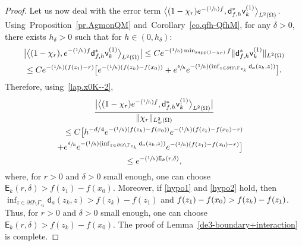 \documentclass[JEP,XML,SOM,Unicode,NoEqCountersInSection,NoFloatCountersInSection,published]{cedram}
\newcommand{\Psfrac}[2]{(\sfrac{#1}{#2})}
\let\lp\langle
\let\rp\rangle
\DeclareMathOperator\supp{supp}
\theoremstyle{plain}
\theoremstyle{definition}
\begin{document}
\begin{proof}
Let us now deal with the error term $ \big \lp (1- \chi_r) e^{-\Psfrac 1hf}, \mathsf d^*_{f,h} \mathsf v_k^{(1)}\big\rp_{L^2(\Omega)} $.
Using~Proposition~\ref{pr.AgmonQM} and~Corollary~\ref{co.qfh-QfhM}, for any $\delta>0$, there exists $h_\delta>0$ such that for $h\in (0,h_\delta)$:\vspace*{-3pt}
\begin{multline*}
\big \vert \big \lp(1- \chi_r),e^{-\Psfrac 1hf}\mathsf d^*_{f,h} \mathsf v_k^{(1)}\big\rp_{L^2(\Omega)}\big \vert \le C e^{-\Psfrac 1h \min_{ \supp (1-\chi_r) }f }\Vert\mathsf d^*_{f,h} \mathsf v_k^{(1)} \Vert_{L^2(\Omega)} \\
\le Ce^{-\Psfrac 1h (f(z_1)-r)} \big[ e^{-\Psfrac 1h(f(z_k)-f(x_0))}+e^{\sfrac{ \delta }{h}} e^{-\Psfrac 1h(\inf_{z\in \partial \Omega \setminus \Gamma_{z_k}} \mathsf d_a(z_k,z))}\big].
\end{multline*}
\enlargethispage{-2\baselineskip}
\pagebreak[2]
Therefore, using~\eqref{lap.x0K--2},\vspace*{-3pt}
\begin{multline*}
\frac{ \big \vert \big \lp (1- \chi_r) e^{-\Psfrac 1hf}, \mathsf d^*_{f,h} \mathsf v_k^{(1)}\big\rp_{L^2(\Omega)} \big \vert }{\Vert \chi_r\Vert_{L^2_w(\Omega)}}\\
\le C\big[ h^{-d/4} e^{-\Psfrac 1h(f(z_k)-f(x_0))} e^{-\Psfrac 1h(f(z_1)-f(x_0)-r)}\\
\shoveright{+ e^{\sfrac{ \delta }{h}} e^{-\Psfrac 1h(\inf_{z\in \partial \Omega \setminus \Gamma_{z_k}} \mathsf d_a(z_k,z))}e^{-\Psfrac 1h (f(z_1)-f(x_0)-r)}\big]}\\
\le e^{-\Psfrac1h \mathsf E_k(r,\delta) },
\end{multline*}
where, for $r>0$ and $\delta>0$ small enough, one can choose
$\mathsf E_k(r,\delta)>f(z_1)-f(x_0)$. Moreover, if \eqref{hypo1}
and \eqref{hypo2} hold, then $\inf_{z\in \partial \Omega \setminus
\Gamma_{z_k}} \mathsf d_a(z_k,z)>f(z_k)-f(z_1)$ and
$f(z_1)-\nobreak f(x_0)>f(z_k)-f(z_1)$. Thus, for $r>0$ and $\delta>0$ small
enough, one can choose $\mathsf E_k(r,\delta)>f(z_k)-f(x_0)$.
The proof of Lemma~\ref{de3-boundary+interaction} is complete.
\end{proof}
\end{document}
